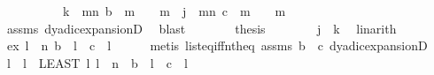 \begin{isabellebody}
\ \ \isamarkupfalse%
\ {\isacharminus}{\kern0pt}\isanewline
\ \ \ \ \isamarkupfalse%
\ {\isachardoublequoteopen}k\ {\isacharplus}{\kern0pt}\ {\isacharparenleft}{\kern0pt}{\isasymSum}m{\isasymin}{\isacharbraceleft}{\kern0pt}{}{\isachardot}{\kern0pt}{\isachardot}{\kern0pt}n{\isacharbraceright}{\kern0pt}{\isachardot}{\kern0pt}\ {\isacharparenleft}{\kern0pt}b\ {\isacharbang}{\kern0pt}\ {\isacharparenleft}{\kern0pt}m{\isacharminus}{\kern0pt}{}{\isacharparenright}{\kern0pt}{\isacharparenright}{\kern0pt}\ {\isacharslash}{\kern0pt}\ {}\ {\isacharcircum}{\kern0pt}\ m{\isacharparenright}{\kern0pt}\ {\isacharequal}{\kern0pt}\ j\ {\isacharplus}{\kern0pt}\ {\isacharparenleft}{\kern0pt}{\isasymSum}m{\isasymin}{\isacharbraceleft}{\kern0pt}{}{\isachardot}{\kern0pt}{\isachardot}{\kern0pt}n{\isacharbraceright}{\kern0pt}{\isachardot}{\kern0pt}\ {\isacharparenleft}{\kern0pt}c\ {\isacharbang}{\kern0pt}\ {\isacharparenleft}{\kern0pt}m{\isacharminus}{\kern0pt}{}{\isacharparenright}{\kern0pt}{\isacharparenright}{\kern0pt}\ {\isacharslash}{\kern0pt}\ {}\ {\isacharcircum}{\kern0pt}\ m{\isacharparenright}{\kern0pt}{\isachardoublequoteclose}\isanewline
\ \ \ \ \ \ \isamarkupfalse%
\ assms\ dyadic{\isacharunderscore}{\kern0pt}expansionD{\isacharparenleft}{\kern0pt}{}{\isacharparenright}{\kern0pt}\ \isamarkupfalse%
\ blast\isanewline
\ \ \ \ \isamarkupfalse%
\ \isamarkupfalse%
\ {\isacharquery}{\kern0pt}thesis\isanewline
\ \ \ \ \ \ \isamarkupfalse%
\ {\isacartoucheopen}j\ {\isacharequal}{\kern0pt}\ k{\isacartoucheclose}\ \isamarkupfalse%
\ linarith\isanewline
\ \ \isamarkupfalse%
\isanewline
\ \ \isamarkupfalse%
\ ex{\isacharcolon}{\kern0pt}\ {\isachardoublequoteopen}{\isasymexists}l\ {\isacharless}{\kern0pt}\ n{\isachardot}{\kern0pt}\ b\ {\isacharbang}{\kern0pt}\ l\ {\isasymnoteq}\ c\ {\isacharbang}{\kern0pt}\ l{\isachardoublequoteclose}\isanewline
\ \ \ \ \isamarkupfalse%
\ {\isacharparenleft}{\kern0pt}metis\ list{\isacharunderscore}{\kern0pt}eq{\isacharunderscore}{\kern0pt}iff{\isacharunderscore}{\kern0pt}nth{\isacharunderscore}{\kern0pt}eq\ assms\ {\isacartoucheopen}b\ {\isasymnoteq}\ c{\isacartoucheclose}\ dyadic{\isacharunderscore}{\kern0pt}expansionD{\isacharparenleft}{\kern0pt}{}{\isacharparenright}{\kern0pt}{\isacharparenright}{\kern0pt}\isanewline
\ \ \isamarkupfalse%
\ l\ \ {\isachardoublequoteopen}l\ {\isasymequiv}\ LEAST\ l{\isachardot}{\kern0pt}\ l\ {\isacharless}{\kern0pt}\ n\ {\isasymand}\ b\ {\isacharbang}{\kern0pt}\ l\ {\isasymnoteq}\ c\ {\isacharbang}{\kern0pt}\ l{\isachardoublequoteclose}\isanewline

\end{isabellebody}
